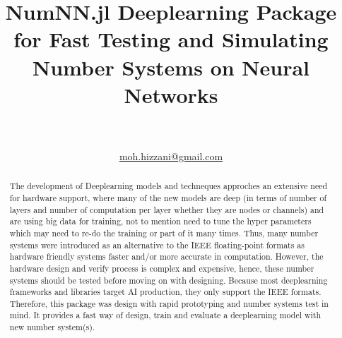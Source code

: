 \documentclass[onecolumn,draftcls,12pt]{IEEEtran}
\title{NumNN.jl Deeplearning Package for Fast Testing and Simulating Number Systems on Neural Networks}
\author{\IEEEauthorblockN{Mohammad~Hizzani} \\ \IEEEauthorblockA{University of Lisbon}\\
\href{mailto:moh.hizzani@gmail.com}{moh.hizzani@gmail.com}}
\begin{document}
	\maketitle

	\begin{abstract}
		The development of Deeplearning models and techneques approches an extensive need for hardware support, where many of the new models are deep (in terms of number of layers and number of computation per layer whether they are nodes or channels) and are using big data for training, not to mention need to tune the hyper parameters which may need to re-do the training or part of it many times. Thus, many number systems were introduced as an alternative to the IEEE floating-point formats as hardware friendly systems faster and/or more accurate in computation. However, the hardware design and verify process is complex and expensive, hence, these number systems should be tested before moving on with designing. Because most deeplearning frameworks and libraries target AI production, they only support the IEEE formats. Therefore, this package was design with rapid prototyping and number systems test in mind. It provides a fast way of design, train and evaluate a deeplearning model with new number system(s).
	\end{abstract}

	
	
	
	
	
	
\end{document}
